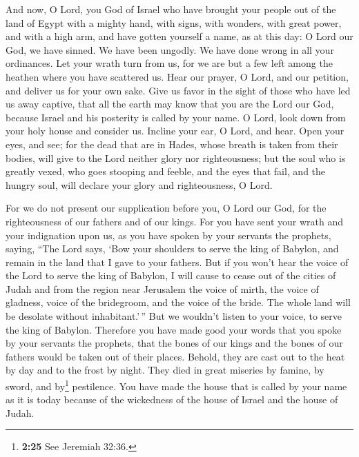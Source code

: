  And now, O Lord, you God of Israel who have brought your
people out of the land of Egypt with a mighty hand, with signs, with
wonders, with great power, and with a high arm, and have gotten yourself
a name, as at this day:  O Lord our God, we have sinned.
We have been ungodly. We have done wrong in all your ordinances.
 Let your wrath turn from us, for we are but a few left
among the heathen where you have scattered us.  Hear our
prayer, O Lord, and our petition, and deliver us for your own sake. Give
us favor in the sight of those who have led us away captive,
 that all the earth may know that you are the Lord our
God, because Israel and his posterity is called by your name.
 O Lord, look down from your holy house and consider us.
Incline your ear, O Lord, and hear.  Open your eyes, and
see; for the dead that are in Hades, whose breath is taken from their
bodies, will give to the Lord neither glory nor righteousness;
 but the soul who is greatly vexed, who goes stooping and
feeble, and the eyes that fail, and the hungry soul, will declare your
glory and righteousness, O Lord.

 For we do not present our supplication before you, O
Lord our God, for the righteousness of our fathers and of our kings.
 For you have sent your wrath and your indignation upon
us, as you have spoken by your servants the prophets, saying,
 ``The Lord says, `Bow your shoulders to serve the king
of Babylon, and remain in the land that I gave to your fathers.
 But if you won't hear the voice of the Lord to serve the
king of Babylon,  I will cause to cease out of the cities
of Judah and from the region near Jerusalem the voice of mirth, the
voice of gladness, voice of the bridegroom, and the voice of the bride.
The whole land will be desolate without inhabitant.'\,'' 
But we wouldn't listen to your voice, to serve the king of Babylon.
Therefore you have made good your words that you spoke by your servants
the prophets, that the bones of our kings and the bones of our fathers
would be taken out of their places.  Behold, they are
cast out to the heat by day and to the frost by night. They died in
great miseries by famine, by sword, and by\footnote{\textbf{2:25} See
  Jeremiah 32:36.} pestilence.  You have made the house
that is called by your name as it is today because of the wickedness of
the house of Israel and the house of Judah.


